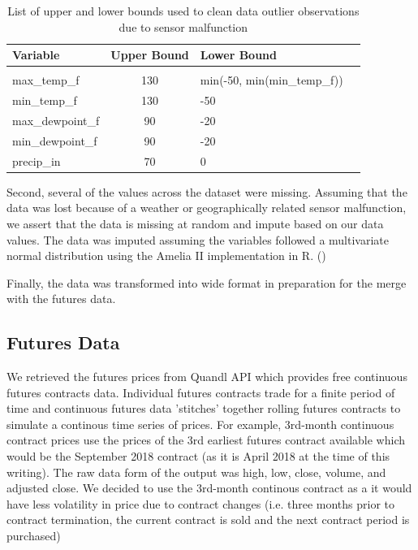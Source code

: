\documentclass[twoside,11pt]{article}
\begin{document}
	\begin{table}[htbp]
		\centering
		\begin{tabular}{lclc}
			Variable & Upper Bound & Lower Bound \\
			\hline \\[-11pt]
			max\_temp\_f & 130 & min(-50, min(min\_temp\_f))\\
			min\_temp\_f & 130 & -50 \\
			max\_dewpoint\_f & 90 & -20\\
			min\_dewpoint\_f & 90 & -20\\
			precip\_in & 70 & 0\\
			\hline
		\end{tabular}
		\label{tab:bounds}
		\caption{List of upper and lower bounds used to clean data outlier observations due to sensor malfunction}
	\end{table}

	Second, several of the values across the dataset were missing. Assuming that the data was lost because of a weather or geographically related sensor malfunction, we assert that the data is missing at random and impute based on our data values. The data was imputed assuming the variables followed a multivariate normal distribution using the Amelia II implementation in R. (\cite{ameila})
	
	Finally, the data was transformed into wide format in preparation for the merge with the futures data. 

\subsection{Futures Data}
 
We retrieved the futures prices from Quandl API which provides free continuous futures contracts data. Individual futures contracts trade for a finite period of time and continuous futures data 'stitches' together rolling futures contracts to simulate a continous time series of prices.  For example, 3rd-month continuous contract prices use the prices of the 3rd earliest futures contract available which would be the September 2018 contract (as it is April 2018 at the time of this writing).  The raw data form of the output was high, low, close, volume, and adjusted close. We decided to use the 3rd-month continous contract as a it would have less volatility in price due to contract changes (i.e. three months prior to contract termination, the current contract is sold and the next contract period is purchased)
\end{document}
